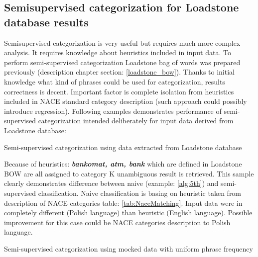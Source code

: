 \subsection{Semisupervised categorization for Loadstone database results}
Semisupervised categorization is very useful but requires much more complex analysis. It requires knowledge about heuristics included in input data. To perform semi-supervised categorization Loadstone bag of words was prepared previously (description chapter section: \ref{loadstone_bow}). Thanks to initial knowledge what kind of phrases could be used for categorization, results correctness is decent. Important factor is complete isolation from heuristics included in NACE standard category description (such approach could possibly introduce regression). Following examples demonstrates performance of semi-supervised categorization intended deliberately for input data derived from Loadstone database:
\newline
\begin{algorithm}[h]
	
	\hfill \break
	\caption{Semi-supervised categorization using data extracted from Loadstone database}
	\label{alg:6th}
\end{algorithm}
\newline
Because of heuristics: \textbf{\textit{bankomat, atm, bank}} which are defined in Loadstone BOW are all assigned to category K unambiguous result is retrieved. This sample clearly demonstrates difference between naive (example: \ref{alg:5th}) and semi-supervised classification. Naive classification is basing on heuristic taken from description of NACE categories table: \ref{tab:NaceMatching}. Input data were in completely different (Polish language) than heuristic (English language). Possible improvement for this case could be NACE categories description to Polish language.  
\newline
\begin{algorithm}[h]
	
	\hfill \break
	\caption{Semi-supervised categorization using mocked data with uniform phrase frequency}
	\label{alg:7th}
\end{algorithm}

